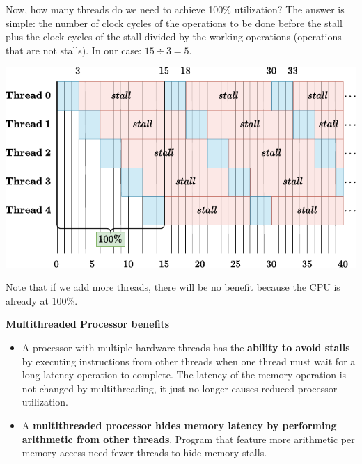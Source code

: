 \begin{examplebox}
    Now, how many threads do we need to achieve 100\% utilization? The answer is simple: the number of clock cycles of the operations to be done before the stall plus the clock cycles of the stall divided by the working operations (operations that are not stalls). In our case: $15 \div 3 = 5$.
    \begin{center}
        \includegraphics[width=\textwidth]{img/multi-threading-3.pdf}
    \end{center}

    Note that if we add more threads, there will be no benefit because the CPU is already at 100\%.
\end{examplebox}

\begin{flushleft}
    \textcolor{Green3}{ \textbf{Multithreaded Processor benefits}}
\end{flushleft}
\begin{itemize}
    \item A processor with multiple hardware threads has the \textbf{ability to avoid stalls} by executing instructions from other threads when one thread must wait for a long latency operation to complete. The latency of the memory operation is not changed by multithreading, it just no longer causes reduced processor utilization.
    
    \item A \textbf{multithreaded processor hides memory latency by performing arithmetic from other threads}. Program that feature more arithmetic per memory access need fewer threads to hide memory stalls.
\end{itemize}

